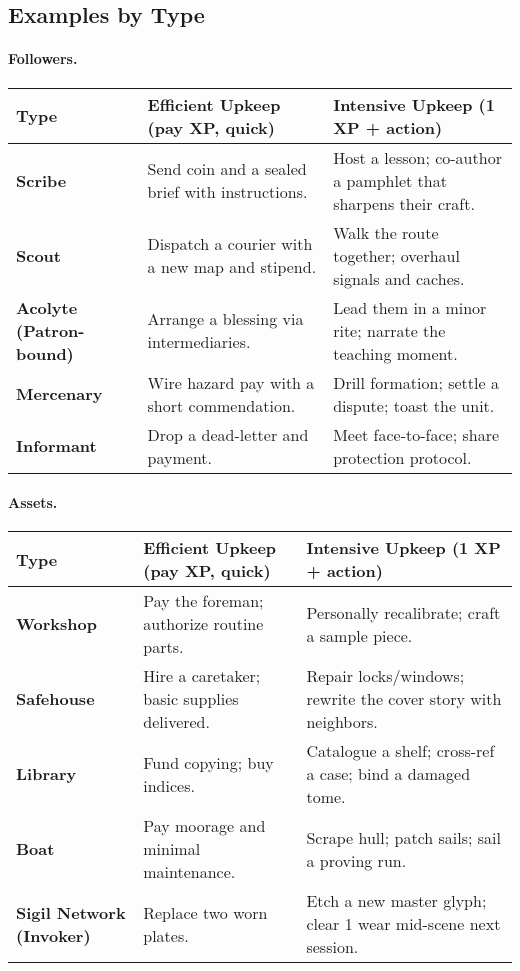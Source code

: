 \subsection{Examples by Type}\label{subsec:upkeep-examples}
\paragraph{Followers.}
\begin{tabularx}{\linewidth}{>{\bfseries}l X X}
\toprule
Type & Efficient Upkeep (pay XP, quick) & Intensive Upkeep (1 XP + action) \\
\midrule
Scribe & Send coin and a sealed brief with instructions. & Host a lesson; co-author a pamphlet that sharpens their craft. \\
Scout & Dispatch a courier with a new map and stipend. & Walk the route together; overhaul signals and caches. \\
Acolyte (Patron-bound) & Arrange a blessing via intermediaries. & Lead them in a minor rite; narrate the teaching moment. \\
Mercenary & Wire hazard pay with a short commendation. & Drill formation; settle a dispute; toast the unit. \\
Informant & Drop a dead-letter and payment. & Meet face-to-face; share protection protocol. \\
\bottomrule
\end{tabularx}

\paragraph{Assets.}
\begin{tabularx}{\linewidth}{>{\bfseries}l X X}
\toprule
Type & Efficient Upkeep (pay XP, quick) & Intensive Upkeep (1 XP + action) \\
\midrule
Workshop & Pay the foreman; authorize routine parts. & Personally recalibrate; craft a sample piece. \\
Safehouse & Hire a caretaker; basic supplies delivered. & Repair locks/windows; rewrite the cover story with neighbors. \\
Library & Fund copying; buy indices. & Catalogue a shelf; cross-ref a case; bind a damaged tome. \\
Boat & Pay moorage and minimal maintenance. & Scrape hull; patch sails; sail a proving run. \\
Sigil Network (Invoker) & Replace two worn plates. & Etch a new master glyph; clear 1 wear mid-scene next session. \\
\bottomrule
\end{tabularx}

